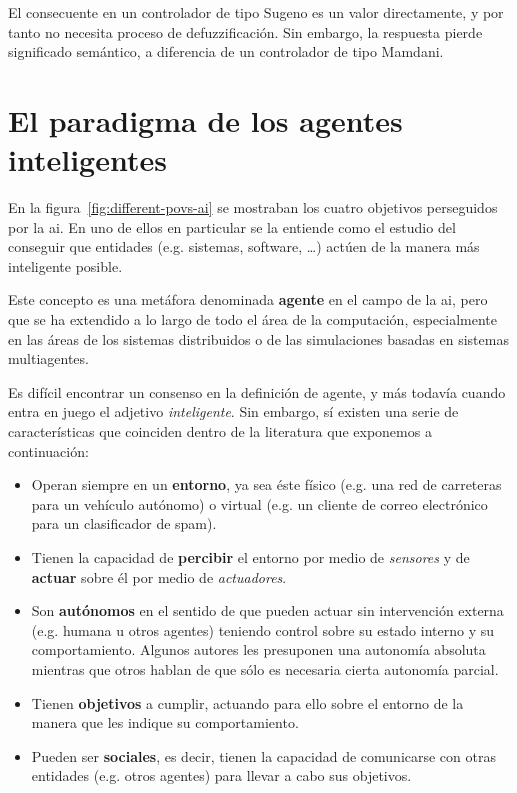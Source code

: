 El consecuente en un controlador de tipo Sugeno es un valor directamente, y por tanto no necesita proceso de defuzzificación. Sin embargo, la respuesta pierde significado semántico, a diferencia de un controlador de tipo Mamdani.

\section{El paradigma de los agentes inteligentes}
\label{ch:ci:s:agent-concept}

En la figura~\ref{fig:different-povs-ai} se mostraban los cuatro objetivos perseguidos por la \gls{ai}. En uno de ellos en particular se la entiende como el estudio del conseguir que entidades (e.g. sistemas, software, \ldots) actúen de la manera más inteligente posible.

Este concepto es una metáfora denominada \textbf{agente} en el campo de la \ac{ai}, pero que se ha extendido a lo largo de todo el área de la computación, especialmente en las áreas de los sistemas distribuidos o de las simulaciones basadas en sistemas multiagentes.

Es difícil encontrar un consenso en la definición de agente, y más todavía cuando entra en juego el adjetivo \textit{inteligente}. Sin embargo, sí existen una serie de características que coinciden dentro de la literatura que exponemos a continuación:

\begin{itemize}
	\item Operan siempre en un \textbf{entorno}, ya sea éste físico (e.g. una red de carreteras para un vehículo autónomo) o virtual (e.g. un cliente de correo electrónico para un clasificador de spam).
	\item Tienen la capacidad de \textbf{percibir} el entorno por medio de \textit{sensores} y de \textbf{actuar} sobre él por medio de \textit{actuadores}.
	\item Son \textbf{autónomos} en el sentido de que pueden actuar sin intervención externa (e.g. humana u otros agentes) teniendo control sobre su estado interno y su comportamiento. Algunos autores les presuponen una autonomía absoluta mientras que otros hablan de que sólo es necesaria cierta autonomía parcial.
	\item Tienen \textbf{objetivos} a cumplir, actuando para ello sobre el entorno de la manera que les indique su comportamiento.
	\item Pueden ser \textbf{sociales}, es decir, tienen la capacidad de comunicarse con otras entidades (e.g. otros agentes) para llevar a cabo sus objetivos.
\end{itemize}

